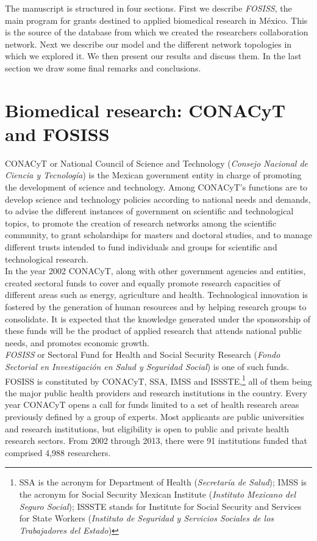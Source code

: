 \documentclass{bmcart}
\begin{document}
The manuscript is structured in four sections. First we describe
\textit{FOSISS}, the main program for grants destined to applied
biomedical research in M\'exico. This is the source of the database
from which we created the researchers collaboration network. Next we
describe our model and the different network topologies in which we
explored it.  We then present our results and discuss them. In the
last section we draw some final remarks and conclusions.

\section*{Biomedical research: CONACyT and FOSISS}

CONACyT or National Council of Science and Technology (\emph{Consejo
  Nacional de Ciencia y Tecnolog\'ia}) is the Mexican government
entity in charge of promoting the development of science and
technology.  Among CONACyT's functions are to develop science and
technology policies according to national needs and demands, to advise
the different instances of government on scientific and technological
topics, to promote the creation of research networks among the
scientific community, to grant scholarships for masters and doctoral
studies, and to manage different trusts intended to fund individuals
and groups for scientific and
technological research.\\

In the year 2002 CONACyT, along with other government agencies and
entities, created sectoral funds
to cover and equally
promote research capacities of different areas such as energy, agriculture
and health. Technological innovation is fostered by the generation of human resources
and by helping research groups to consolidate. It is expected that the
knowledge generated under the sponsorship of these funds
will be the product of applied research that attends national public
needs, and promotes economic growth.\\

\emph{FOSISS} or Sectoral Fund for Health and Social Security Research
(\emph{Fondo Sectorial en Investigaci\'on en Salud y Seguridad Social}) is one of
such funds. FOSISS is constituted by CONACyT, SSA, IMSS and ISSSTE,\footnote{SSA
  is the acronym for Department of Health (\emph{Secretar\'ia de Salud}); IMSS is
  the acronym for Social Security Mexican Institute (\emph{Instituto Mexicano
    del Seguro Social}); ISSSTE stands for Institute for Social Security and
  Services for State Workers (\emph{Instituto de Seguridad y Servicios Sociales
    de los Trabajadores del Estado})} all of them being the major public health
providers and research institutions in the country. Every year CONACyT opens a
call for funds limited to a set of health research areas previously defined by a
group of experts. Most applicants are public universities and research
institutions, but eligibility is open to public and private health research sectors.
From 2002 through 2013, there were 91 institutions funded that
comprised 4,988 researchers.\\ 
\end{document}
